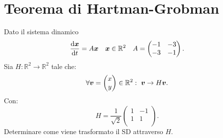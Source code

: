 \section{Teorema di Hartman-Grobman}%
\begin{ex}
    Dato il sistema dinamico 
     \[
        \frac{\text{d} \boldsymbol{x}}{\text{d} t} = A \boldsymbol{x} \quad  \boldsymbol{x}\in \mathbb{R}^2 \quad  A = 
    \begin{pmatrix}
	-1 & -3 \\
	-3 & -1 \\
    \end{pmatrix}
    .\] 
    Sia $H:\mathbb{R}^2\to \mathbb{R}^2 $  tale che:
    \[
        \forall \boldsymbol{v} = \begin{pmatrix} x \\ y \end{pmatrix} \in \mathbb{R}^2: \ \boldsymbol{v}\to H\boldsymbol{v}
    .\] 
    Con:
    \[
        H = \frac{1}{\sqrt{2} } 
    \begin{pmatrix}
	1 & -1 \\
	1 & 1 \\
    \end{pmatrix}
    .\]  
    Determinare come viene trasformato il SD attraverso $H$.
\end{ex}
\noindent
